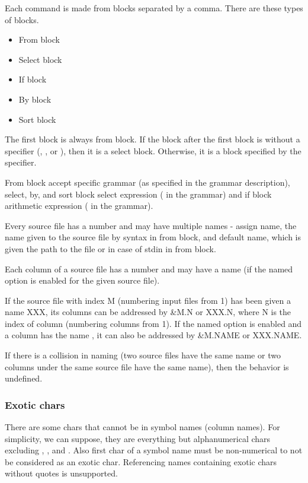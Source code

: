 Each command is made from blocks separated by a comma. There are these types of blocks.
\begin{itemize}
    \item From block
    \item Select block
    \item If block
    \item By block
    \item Sort block
\end{itemize}

The first block is always from block. If the block after the first block is without a specifier (, , or ), then it is a select block. Otherwise, it is a block specified by the specifier.

From block accept specific grammar (as specified in the grammar description), select, by, and sort block select expression ( in the grammar) and if block arithmetic expression ( in the grammar).

Every source file has a number and may have multiple names - assign name, the name given to the source file by  syntax in from block, and  
default name, which is given the path to the file or \icode{-} in case of stdin in from block.

Each column of a source file has a number and may have a name (if the named option is enabled for the given source file).

If the source file with index M (numbering input files from 1) has been given a name XXX, its columns can be addressed by \&M.N or XXX.N, where N is the index of column (numbering columns from 1).  
If the named option is enabled and a column has the name , it can also be addressed by \&M.NAME or XXX.NAME.

If there is a collision in naming (two source files have the same name or two columns under the same source file have the same name), then the behavior is undefined.

\subsubsection{Exotic chars}
There are some chars that cannot be in symbol names (column names). For simplicity, we can suppose, they are everything but alphanumerical chars excluding \icode{-}, , \icode{\&} and \icode{\_}.  
Also first char of a symbol name must be non-numerical to not be considered as an exotic char.
Referencing names containing exotic chars without quotes is unsupported.

